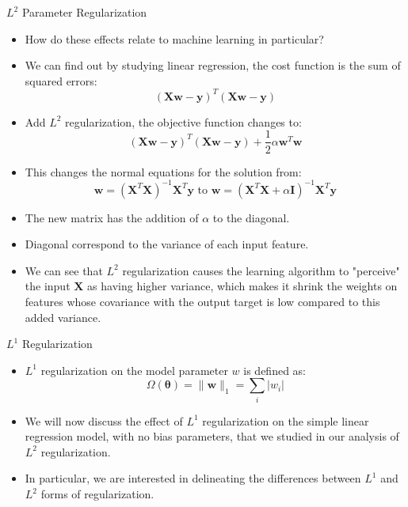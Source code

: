 \documentclass[10pt]{beamer}
\begin{document}
	\begin{frame}{$L^2$ Parameter Regularization}
		\begin{itemize}
			\item How do these effects relate to machine learning in particular?
			\pause
			\item We can find out by studying linear regression, the cost function is the sum of squared errors:
			$$(\bm{Xw}-\bm{y})^T(\bm{Xw}-\bm{y})$$
			
			\pause
			\item Add $L^2$ regularization, the objective function changes to:
			$$(\bm{Xw}-\bm{y})^T(\bm{Xw}-\bm{y})+\frac{1}{2}\alpha\bm{w}^T\bm{w}$$
			
			\pause
			\item This changes the normal equations for the solution from:
			$$\bm{w}=(\bm{X}^T\bm{X})^{-1}\bm{X}^T\bm{y} \text{~to~} \bm{w}=(\bm{X}^T\bm{X}+\alpha\bm{I})^{-1}\bm{X}^T\bm{y}$$
			
			\pause
			\item The new matrix has the addition of $\alpha$ to the diagonal.
			\pause
			\item Diagonal correspond to the variance of each input feature.
			\pause
			\item We can see that $L^2$ regularization causes the learning algorithm to "perceive" the input $\bm{X}$ as having higher variance, which makes it shrink the weights on features whose covariance with the output target is low compared to this added variance.
		\end{itemize}
	\end{frame}

	\begin{frame}{$L^1$ Regularization}
		\begin{itemize}
			\item $L^1$ regularization on the model parameter $w$ is defined as:
			$$\Omega(\bm{\theta})=\lVert\bm{w}\rVert_1=\sum_i\left|w_i\right|$$
			
			\item We will now discuss the effect of $L^1$ regularization on the simple linear regression model, with no bias parameters, that we studied in our analysis of $L^2$ regularization.
			\pause
			\item In particular, we are interested in delineating the differences between $L^1$ and $L^2$ forms of regularization.
		\end{itemize}
	\end{frame}
\end{document}
